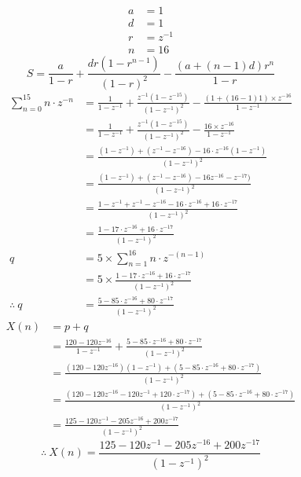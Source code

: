\documentclass[journal,12pt,onecolumn]{IEEEtran}
\theoremstyle{remark}
\begin{document}
\[
\begin{aligned}
 a&=1\\
 d&=1\\
 r&=z^{-1}\\
 n&=16
\end{aligned}
\]
\[ S= \frac{a}{1 - r} + \frac{dr(1 - r^{n-1})}{(1 - r)^2}-\frac{(a+(n-1)d) r^{n}}{1-r} \]
\[
\begin{aligned}
   \sum_{n=0}^{15}n\cdot z^{-n}&= \frac{1}{1 - z^{-1} }+ \frac{z^{-1}(1 - z^{-15})}{(1 - z^{-1})^2}-\frac{(1+(16-1)1)\times z^{-16}}{1-z^{-1}} \\
&=\frac{1}{1 - z^{-1} }+ \frac{z^{-1}(1 - z^{-15})}{(1 - z^{-1})^2}-\frac{16\times z^{-16}}{1-z^{-1}}\\
&=\frac{(1-z^{-1})+(z^{-1}-z^{-16})-16\cdot z^{-16}(1-z^{-1})}{(1-z^{-1})^{2}}\\
&=\frac{(1-z^{-1})+(z^{-1}-z^{-16})-16z^{-16}-z^{-17})}{(1-z^{-1})^{2}}\\
&=\frac{1-z^{-1}+z^{-1}-z^{-16}-16\cdot z^{-16}+16\cdot z^{-17}}{(1-z^{-1})^{2}}\\
&=\frac{1-17\cdot z^{-16}+16\cdot z^{-17}}{(1-z^{-1})^{2}}\\
q&=5\times \sum_{n=1}^{16}n\cdot z^{-(n-1)}\\
&=5\times\frac{1-17\cdot z^{-16}+16\cdot z^{-17}}{(1-z^{-1})^{2}}\\
\therefore \ q&=\frac{5-85\cdot z^{-16}+80\cdot z^{-17}}{(1-z^{-1})^{2}}
\end{aligned}
\]
\[
\begin{aligned}
   X(n)&=p+q\\
   &=\frac{120 -120 z^{-16}}{1-z^{-1}}+\frac{5-85\cdot z^{-16}+80\cdot z^{-17}}{(1-z^{-1})^{2}}\\
   &=\frac{(120 -120 z^{-16})(1-z^{-1})+(5-85\cdot z^{-16}+80\cdot z^{-17})}{(1-z^{-1})^2}\\
   &=\frac{(120-120 z^{-16}-120 z^{-1}+120\cdot z^{-17})+(5-85\cdot z^{-16}+80\cdot z^{-17})}{(1-z^{-1})^2}\\
   &=\frac{125 -120 z^{-1}-205 z^{-16}+200 z^{-17}}{(1-z^{-1})^2}
\end{aligned}
\]
\[\therefore \ X(n)=\frac{125 -120 z^{-1}-205 z^{-16}+200 z^{-17}}{(1-z^{-1})^2}\]
\end{document}
